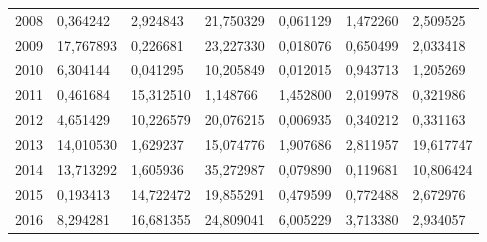 \begin{table}
\begin{tabular}{p{1cm}p{2cm}p{2cm}p{2cm}p{2cm}p{2cm}p{2cm}}
 2008 &                             0,364242 &                                    2,924843 &                  21,750329 &                                  0,061129 &                           1,472260 &                                  2,509525 \\
 2009 &                            17,767893 &                                    0,226681 &                  23,227330 &                                  0,018076 &                           0,650499 &                                  2,033418 \\
 2010 &                             6,304144 &                                    0,041295 &                  10,205849 &                                  0,012015 &                           0,943713 &                                  1,205269 \\
 2011 &                             0,461684 &                                   15,312510 &                   1,148766 &                                  1,452800 &                           2,019978 &                                  0,321986 \\
 2012 &                             4,651429 &                                   10,226579 &                  20,076215 &                                  0,006935 &                           0,340212 &                                  0,331163 \\
 2013 &                            14,010530 &                                    1,629237 &                  15,074776 &                                  1,907686 &                           2,811957 &                                 19,617747 \\
 2014 &                            13,713292 &                                    1,605936 &                  35,272987 &                                  0,079890 &                           0,119681 &                                 10,806424 \\
 2015 &                             0,193413 &                                   14,722472 &                  19,855291 &                                  0,479599 &                           0,772488 &                                  2,672976 \\
 2016 &                             8,294281 &                                   16,681355 &                  24,809041 &                                  6,005229 &                           3,713380 &                                  2,934057 \\
\bottomrule
\end{tabular}
\end{table}
